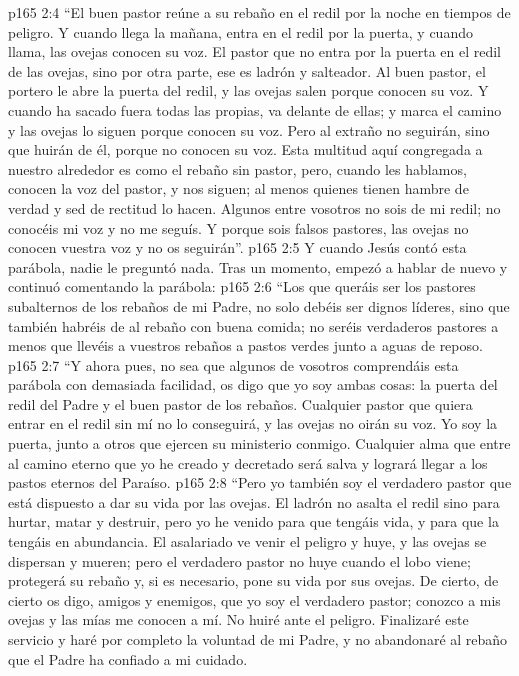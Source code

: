 \vs p165 2:4 “El buen pastor reúne a su rebaño en el redil por la noche en tiempos de peligro. Y cuando llega la mañana, entra en el redil por la puerta, y cuando llama, las ovejas conocen su voz. El pastor que no entra por la puerta en el redil de las ovejas, sino por otra parte, ese es ladrón y salteador. Al buen pastor, el portero le abre la puerta del redil, y las ovejas salen porque conocen su voz. Y cuando ha sacado fuera todas las propias, va delante de ellas; y marca el camino y las ovejas lo siguen porque conocen su voz. Pero al extraño no seguirán, sino que huirán de él, porque no conocen su voz. Esta multitud aquí congregada a nuestro alrededor es como el rebaño sin pastor, pero, cuando les hablamos, conocen la voz del pastor, y nos siguen; al menos quienes tienen hambre de verdad y sed de rectitud lo hacen. Algunos entre vosotros no sois de mi redil; no conocéis mi voz y no me seguís. Y porque sois falsos pastores, las ovejas no conocen vuestra voz y no os seguirán”.
\vs p165 2:5 \pc Y cuando Jesús contó esta parábola, nadie le preguntó nada. Tras un momento, empezó a hablar de nuevo y continuó comentando la parábola:
\vs p165 2:6 “Los que queráis ser los pastores subalternos de los rebaños de mi Padre, no solo debéis ser dignos líderes, sino que también habréis de  al rebaño con buena comida; no seréis verdaderos pastores a menos que llevéis a vuestros rebaños a pastos verdes junto a aguas de reposo.
\vs p165 2:7 “Y ahora pues, no sea que algunos de vosotros comprendáis esta parábola con demasiada facilidad, os digo que yo soy ambas cosas: la puerta del redil del Padre y el buen pastor de los rebaños. Cualquier pastor que quiera entrar en el redil sin mí no lo conseguirá, y las ovejas no oirán su voz. Yo soy la puerta, junto a otros que ejercen su ministerio conmigo. Cualquier alma que entre al camino eterno que yo he creado y decretado será salva y logrará llegar a los pastos eternos del Paraíso.
\vs p165 2:8 “Pero yo también soy el verdadero pastor que está dispuesto a dar su vida por las ovejas. El ladrón no asalta el redil sino para hurtar, matar y destruir, pero yo he venido para que tengáis vida, y para que la tengáis en abundancia. El asalariado ve venir el peligro y huye, y las ovejas se dispersan y mueren; pero el verdadero pastor no huye cuando el lobo viene; protegerá su rebaño y, si es necesario, pone su vida por sus ovejas. De cierto, de cierto os digo, amigos y enemigos, que yo soy el verdadero pastor; conozco a mis ovejas y las mías me conocen a mí. No huiré ante el peligro. Finalizaré este servicio y haré por completo la voluntad de mi Padre, y no abandonaré al rebaño que el Padre ha confiado a mi cuidado.
